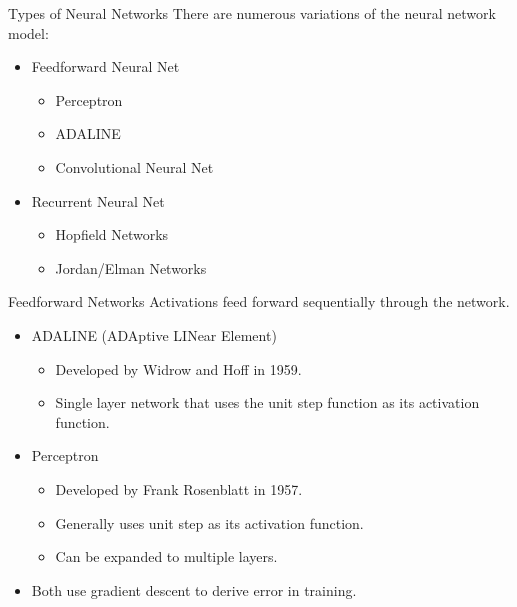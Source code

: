 \documentclass[11pt]{beamer}
\begin{document}
\begin{frame}{Types of Neural Networks}
There are numerous variations of the neural network model:
\begin{itemize}
    \item Feedforward Neural Net
    \begin{itemize}
        \item Perceptron
        \item ADALINE
        \item Convolutional Neural Net
    \end{itemize}
    \item Recurrent Neural Net
    \begin{itemize}
        \item Hopfield Networks
        \item Jordan/Elman Networks
    \end{itemize}
\end{itemize}
\end{frame}

\begin{frame}{Feedforward Networks}
Activations feed forward sequentially through the network.
\begin{itemize}
    \item ADALINE (ADAptive LINear Element)
    \begin{itemize}
        \item Developed by Widrow and Hoff in 1959.
        \item Single layer network that uses the unit step function as its activation function.
    \end{itemize}
    \item Perceptron
    \begin{itemize}
        \item Developed by Frank Rosenblatt in 1957.
        \item Generally uses unit step as its activation function.
        \item Can be expanded to multiple layers.
    \end{itemize}
    \item Both use gradient descent to derive error in training.
\end{itemize}
\end{frame}
\end{document}
